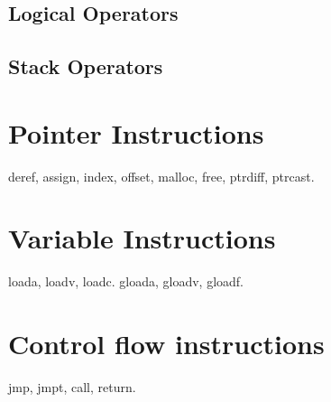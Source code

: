 \subsection{Logical Operators}
\subsection{Stack Operators}

\section{Pointer Instructions}
deref, assign, index, offset, malloc, free, ptrdiff, ptrcast.
\section{Variable Instructions}
loada, loadv, loadc.
gloada, gloadv, gloadf.
\section{Control flow instructions}
jmp, jmpt, call, return.